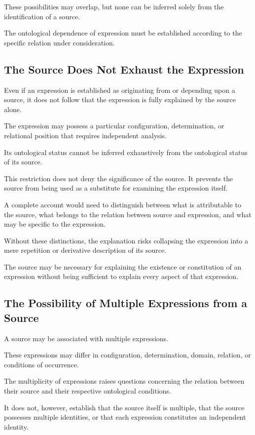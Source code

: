 These possibilities may overlap, but none
can be inferred solely from the identification
of a source.

The ontological dependence of expression
must be established according to the specific
relation under consideration.

\subsection{The Source Does Not Exhaust the Expression}

Even if an expression is established as
originating from or depending upon a source,
it does not follow that the expression is
fully explained by the source alone.

The expression may possess a particular
configuration, determination, or relational
position that requires independent analysis.

Its ontological status cannot be inferred
exhaustively from the ontological status
of its source.

This restriction does not deny the significance
of the source. It prevents the source from
being used as a substitute for examining
the expression itself.

A complete account would need to distinguish
between what is attributable to the source,
what belongs to the relation between source
and expression, and what may be specific
to the expression.

Without these distinctions, the explanation
risks collapsing the expression into a mere
repetition or derivative description of its source.

The source may be necessary for explaining
the existence or constitution of an expression
without being sufficient to explain every
aspect of that expression.

\subsection{The Possibility of Multiple Expressions from a Source}

A source may be associated with multiple
expressions.

These expressions may differ in configuration,
determination, domain, relation, or conditions
of occurrence.

The multiplicity of expressions raises questions
concerning the relation between their source
and their respective ontological conditions.

It does not, however, establish that the source
itself is multiple, that the source possesses
multiple identities, or that each expression
constitutes an independent identity.

